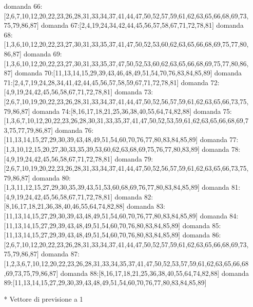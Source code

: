 domanda 66:[2,6,7,10,12,20,22,23,26,28,31,33,34,37,41,44,47,50,52,57,59,61,62,63,65,66,68,69,73,75,79,86,87]
domanda 67:[2,4,19,24,34,42,44,45,56,57,58,67,71,72,78,81]
domanda 68:[1,3,6,10,12,20,22,23,27,30,31,33,35,37,41,47,50,52,53,60,62,63,65,66,68,69,75,77,80,86,87]
domanda 69:[1,3,6,10,12,20,22,23,27,30,31,33,35,37,47,50,52,53,60,62,63,65,66,68,69,75,77,80,86,87]
domanda 70:[11,13,14,15,29,39,43,46,48,49,51,54,70,76,83,84,85,89]
domanda 71:[2,4,7,19,24,28,34,41,42,44,45,56,57,58,59,67,71,72,78,81]
domanda 72:[4,9,19,24,42,45,56,58,67,71,72,78,81]
domanda 73:[2,6,7,10,19,20,22,23,26,28,31,33,34,37,41,44,47,50,52,56,57,59,61,62,63,65,66,73,75,79,86,87]
domanda 74:[8,16,17,18,21,25,36,38,40,55,64,74,82,88]
domanda 75:[1,3,6,7,10,12,20,22,23,26,28,30,31,33,35,37,41,47,50,52,53,59,61,62,63,65,66,68,69,73,75,77,79,86,87]
domanda 76:[11,13,14,15,27,29,30,39,43,48,49,51,54,60,70,76,77,80,83,84,85,89]
domanda 77:[1,3,10,12,15,20,27,30,33,35,39,53,60,62,63,68,69,75,76,77,80,83,89]
domanda 78:[4,9,19,24,42,45,56,58,67,71,72,78,81]
domanda 79:[2,6,7,10,19,20,22,23,26,28,31,33,34,37,41,44,47,50,52,56,57,59,61,62,63,65,66,73,75,79,86,87]
domanda 80:[1,3,11,12,15,27,29,30,35,39,43,51,53,60,68,69,76,77,80,83,84,85,89]
domanda 81:[4,9,19,24,42,45,56,58,67,71,72,78,81]
domanda 82:[8,16,17,18,21,36,38,40,46,55,64,74,82,88]
domanda 83:[11,13,14,15,27,29,30,39,43,48,49,51,54,60,70,76,77,80,83,84,85,89]
domanda 84:[11,13,14,15,27,29,39,43,48,49,51,54,60,70,76,80,83,84,85,89]
domanda 85:[11,13,14,15,27,29,39,43,48,49,51,54,60,70,76,80,83,84,85,89]
domanda 86:[2,6,7,10,12,20,22,23,26,28,31,33,34,37,41,44,47,50,52,57,59,61,62,63,65,66,68,69,73,75,79,86,87]
domanda 87:[1,2,3,6,7,10,12,20,22,23,26,28,31,33,34,35,37,41,47,50,52,53,57,59,61,62,63,65,66,68,69,73,75,79,86,87]
domanda 88:[8,16,17,18,21,25,36,38,40,55,64,74,82,88]
domanda 89:[11,13,14,15,27,29,30,39,43,48,49,51,54,60,70,76,77,80,83,84,85,89]

* Vettore di previsione a 1

